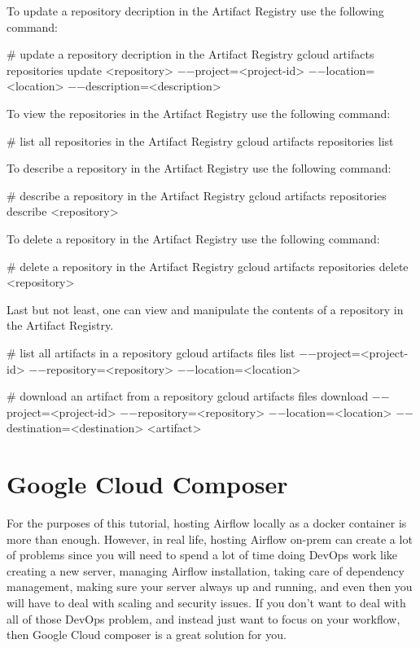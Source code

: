 To update a repository decription in the Artifact Registry use the following command:
\begin{bash}
# update a repository decription in the Artifact Registry
gcloud artifacts repositories update <repository>
    $-$$-$project=<project-id>
    $-$$-$location=<location>
    $-$$-$description=<description>
\end{bash}

To view the repositories in the Artifact Registry use the following command:
\begin{bash}
# list all repositories in the Artifact Registry
gcloud artifacts repositories list
\end{bash}

To describe a repository in the Artifact Registry use the following command:
\begin{bash}
# describe a repository in the Artifact Registry
gcloud artifacts repositories describe <repository>
\end{bash}

To delete a repository in the Artifact Registry use the following command:
\begin{bash}
# delete a repository in the Artifact Registry
gcloud artifacts repositories delete <repository>
\end{bash}

Last but not least, one can view and manipulate the contents of a repository in the Artifact Registry.

\begin{bash}
# list all artifacts in a repository
gcloud artifacts files list
    $-$$-$project=<project-id>
    $-$$-$repository=<repository>
    $-$$-$location=<location>
\end{bash}

\begin{bash}
# download an artifact from a repository
gcloud artifacts files download
    $-$$-$project=<project-id>
    $-$$-$repository=<repository>
    $-$$-$location=<location>
    $-$$-$destination=<destination>
    <artifact>
\end{bash}

\section{Google Cloud Composer}

For the purposes of this tutorial, hosting Airflow locally as a docker container is more than enough. However, in
real life, hosting Airflow on-prem can create a lot of problems since you will need to spend a lot of time doing
DevOps work like creating a new server, managing Airflow installation, taking care of dependency management, making
sure your server always up and running, and even then you will have to deal with scaling and security issues. If you
don't want to deal with all of those DevOps problem, and instead just want to focus on your workflow, then Google
Cloud composer is a great solution for you.

